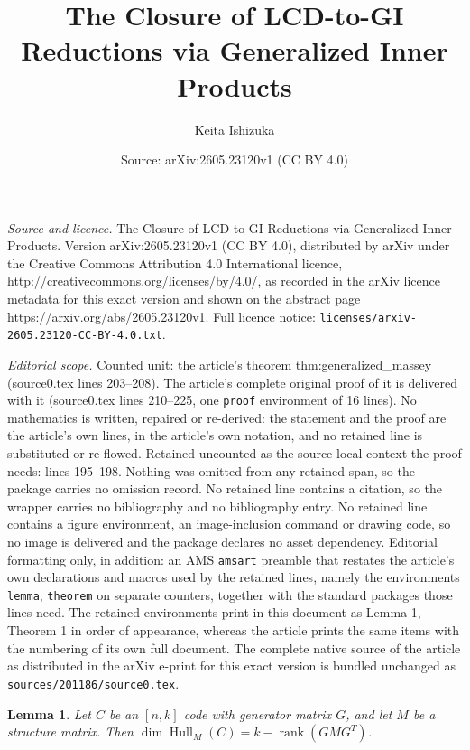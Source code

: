 \documentclass[10pt,a4paper]{amsart}
\title{The Closure of LCD-to-GI Reductions via Generalized Inner Products}
\author{Keita Ishizuka}
\date{Source: arXiv:2605.23120v1 (CC BY 4.0)}
\newtheorem{lemma}{Lemma}
\DeclareMathOperator{\Hull}{Hull}
\DeclareMathOperator{\rank}{rank}
\begin{document}
\maketitle

\noindent\emph{Source and licence.} The Closure of LCD-to-GI Reductions via Generalized Inner Products. Version arXiv:2605.23120v1 (CC BY 4.0), distributed by arXiv under the Creative Commons Attribution 4.0 International licence, http://creativecommons.org/licenses/by/4.0/, as recorded in the arXiv licence metadata for this exact version and shown on the abstract page https://arxiv.org/abs/2605.23120v1. Full licence notice: \texttt{licenses/arxiv-2605.23120-CC-BY-4.0.txt}.\par\smallskip

\noindent\textit{Editorial scope.} Counted unit: the article's theorem thm:generalized\_massey (source0.tex lines 203--208). The article's complete original proof of it is delivered with it (source0.tex lines 210--225, one \texttt{proof} environment of 16 lines). No mathematics is written, repaired or re-derived: the statement and the proof are the article's own lines, in the article's own notation, and no retained line is substituted or re-flowed.  Retained uncounted as the source-local context the proof needs: lines 195--198.  Nothing was omitted from any retained span, so the package carries no omission record.  No retained line contains a citation, so the wrapper carries no bibliography and no bibliography entry.  No retained line contains a figure environment, an image-inclusion command or drawing code, so no image is delivered and the package declares no asset dependency.  Editorial formatting only, in addition: an AMS \texttt{amsart} preamble that restates the article's own declarations and macros used by the retained lines, namely the environments \texttt{lemma}, \texttt{theorem} on separate counters, together with the standard packages those lines need.  The retained environments print in this document as Lemma 1, Theorem 1 in order of appearance, whereas the article prints the same items with the numbering of its own full document.  The complete native source of the article as distributed in the arXiv e-print for this exact version is bundled unchanged as \texttt{sources/201186/source0.tex}.
\begin{lemma}
\label{lem:hull_dimension}
Let $C$ be an $[n,k]$ code with generator matrix $G$, and let $M$ be a structure matrix. Then $\dim \Hull_M(C) = k - \rank(GMG^T)$.
\end{lemma}
\end{document}
